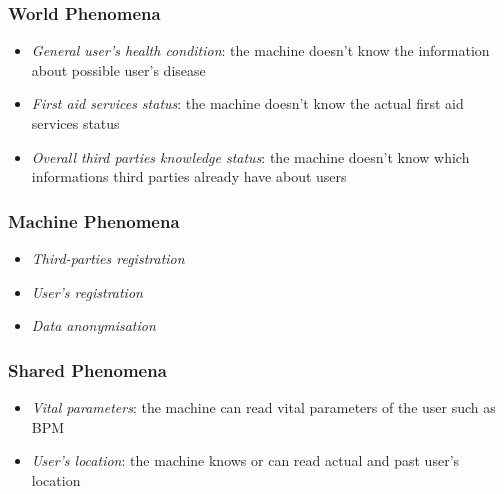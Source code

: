 \documentclass{article}
\begin{document}
\subsubsection{World Phenomena}
\begin{itemize}
	\item \textit{General user’s health condition}: the machine doesn’t know the information about possible user’s disease
	\item \textit{First aid services status}: the machine doesn’t know the actual first aid services status
	\item \textit{Overall third parties knowledge status}: the machine doesn’t know which informations third parties already have about users
\end{itemize}

\subsubsection{Machine Phenomena}
\begin{itemize}
	\item \textit{Third-parties registration}
	\item \textit{User's registration}
	\item \textit{Data anonymisation}
\end{itemize}

\subsubsection{Shared Phenomena}
\begin{itemize}
	\item \textit{Vital parameters}: the machine can read vital parameters of the user such as BPM
	\item \textit{User's location}: the machine knows or can read actual and past user’s location
\end{itemize}
\end{document}
